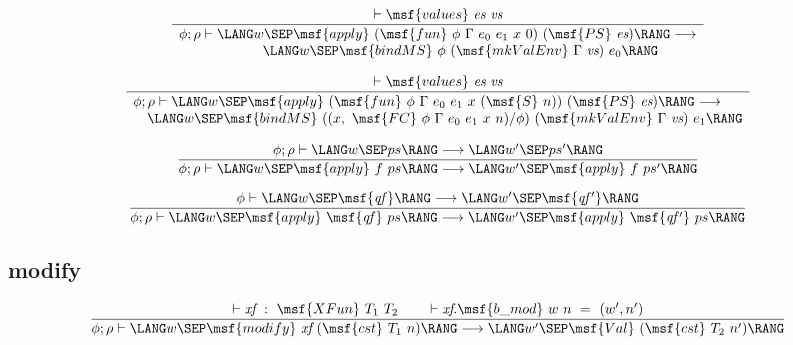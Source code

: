 \documentclass{article}
\begin{document}
\begin{gather}
  \frac{ \vdash \msf{values} \ \mbox{\it es} \ \mbox{\it vs}
  }{ \begin{array}{ll} \phi; \rho \vdash \LANG w \SEP \msf{apply}
      \ (\msf{fun} \ \phi \ \Gamma \ e_0 \ e_1 \ x \ 0) \ (\msf{PS}
      \ \mbox{\it es}) \RANG \longrightarrow \\ \qquad \qquad \qquad
      \LANG w \SEP \msf{bindMS} \ \phi \ (\msf{mkValEnv} \ \Gamma
      \ \mbox{\it vs}) \ e_0 \RANG \end{array}}
\end{gather}

\begin{gather}
  \frac{ \vdash \msf{values} \ \mbox{\it es} \ \mbox{\it vs}
  }{ \begin{array}{ll} \phi; \rho \vdash \LANG w \SEP \msf{apply}
      \ (\msf{fun} \ \phi \ \Gamma \ e_0 \ e_1 \ x \ (\msf{S} \ n))
      \ (\msf{PS} \ \mbox{\it es}) \RANG \longrightarrow \\ \quad
      \LANG w \SEP \msf{bindMS} \ ((x, \ \msf{FC} \ \phi \ \Gamma
      \ e_0 \ e_1 \ x \ n) / \phi) \ (\msf{mkValEnv} \ \Gamma
      \ \mbox{\it vs}) \ e_1 \RANG \end{array}}
\end{gather}

\begin{gather}
  \frac{ \phi; \rho \vdash \LANG w \SEP ps \RANG \longrightarrow \LANG
    w' \SEP ps' \RANG }{ \phi; \rho \vdash \LANG w \SEP \msf{apply}
    \ f \ ps \RANG \longrightarrow \LANG w' \SEP \msf{apply} \ f \ ps'
    \RANG }
\end{gather}

\begin{gather}
  \frac{ \phi \vdash \LANG w \SEP \msf{\it qf} \RANG \longrightarrow
    \LANG w' \SEP \msf{\it qf'} \RANG }{ \phi; \rho \vdash \LANG w
    \SEP \msf{apply} \ \msf{\it qf} \ ps \RANG \longrightarrow \LANG
    w' \SEP \msf{apply} \ \msf{\it qf'} \ ps \RANG }
\end{gather}



\subsection{modify}

\begin{gather}
  \frac{ \vdash \mbox{\it xf} \ : \ \msf{XFun} \ T_1 \ T_2 \qquad
    \vdash \mbox{\it xf}.\msf{b\_mod} \ w \ n \ = \ (w',n') } { \phi;
    \rho \vdash \LANG w \SEP \msf{modify} \ \mbox{\it xf} \ (\msf{cst}
    \ T_1 \ n) \RANG \longrightarrow \LANG w' \SEP \msf{Val}
    \ (\msf{cst} \ T_2 \ n') \RANG }
\end{gather}
\end{document}
